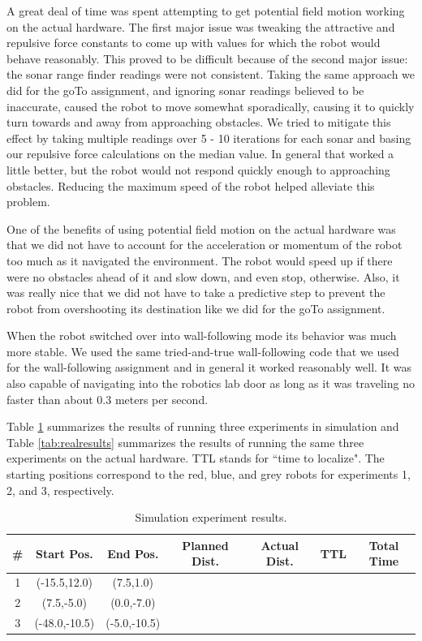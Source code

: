 \documentclass[12pt]{article}
\begin{document}
A great deal of time was spent attempting to get potential field motion working on the actual hardware. The first major issue was tweaking the attractive and repulsive force constants to come up with values for which the robot would behave reasonably. This proved to be difficult because of the second major issue: the sonar range finder readings were not consistent. Taking the same approach we did for the goTo assignment, and ignoring sonar readings believed to be inaccurate, caused the robot to move somewhat sporadically, causing it to quickly turn towards and away from approaching obstacles. We tried to mitigate this effect by taking multiple readings over 5 - 10 iterations for each sonar and basing our repulsive force calculations on the median value. In general that worked a little better, but the robot would not respond quickly enough to approaching obstacles. Reducing the maximum speed of the robot helped alleviate this problem.

One of the benefits of using potential field motion on the actual hardware was that we did not have to account for the acceleration or momentum of the robot too much as it navigated the environment. The robot would speed up if there were no obstacles ahead of it and slow down, and even stop, otherwise. Also, it was really nice that we did not have to take a predictive step to prevent the robot from overshooting its destination like we did for the goTo assignment.

When the robot switched over into wall-following mode its behavior was much more stable. We used the same tried-and-true wall-following code that we used for the wall-following assignment and in general it worked reasonably well. It was also capable of navigating into the robotics lab door as long as it was traveling no faster than about 0.3 meters per second.

Table \ref{tab:simresults} summarizes the results of running three experiments in simulation and Table \ref{tab:realresults} summarizes the results of running the same three experiments on the actual hardware. TTL stands for ``time to localize". The starting positions correspond to the red, blue, and grey robots for experiments 1, 2, and 3, respectively. \\

\begin{table}[h]
\centering
\begin{tabular}{| c | c | c | c | c | c | c |}
\hline
{\#} & Start Pos. & End Pos. & Planned Dist. & Actual Dist. & TTL & Total Time \\
\hline 
1 & (-15.5,12.0) & (7.5,1.0) & & & & \\
\hline 
2 & (7.5,-5.0) & (0.0,-7.0) & & & & \\
\hline 
3 & (-48.0,-10.5) & (-5.0,-10.5) & & & & \\
\hline
\end{tabular}
\caption{Simulation experiment results.}
\label{tab:simresults}
\end{table}
\end{document}
